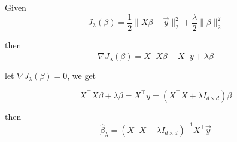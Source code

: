 \begin{answer}

Given 
\begin{equation}
    J_\lambda(\beta)=\frac{1}{2}\|X\beta-\vec{y}\|_2^2+\frac{\lambda}{2}\|\beta\|_2^2    
\end{equation}

then
\begin{equation}
    \nabla J_\lambda(\beta) =  X^\top X \beta -  X^\top y + \lambda \beta
\end{equation}

let $\nabla J_\lambda(\beta) = 0$, we get 

\begin{equation}
     X^\top X \beta + \lambda \beta = X^\top y = (X^\top X + \lambda I_{d \times d}) \beta
\end{equation}

then 
\begin{equation}
    \hat{\beta}_\lambda=(X^\top X+\lambda I_{d\times d})^{-1}X^\top \vec{y}
\end{equation}
\end{answer}
